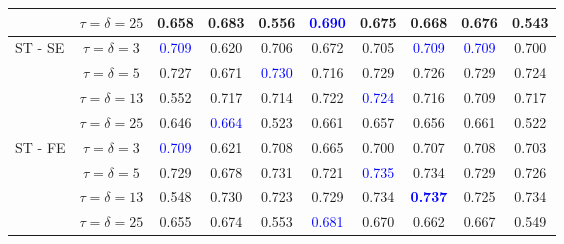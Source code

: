 \documentclass[nohyperref]{article}
\theoremstyle{plain}
\theoremstyle{definition}
\theoremstyle{remark}
\begin{document}
\begin{table*}[h!]
\begin{tabular}{p{2cm}|c|cccccccc}
  & $\tau=\delta=25$ & 0.658	&	0.683	&	0.556	&	\textcolor{blue}{0.690}	&	0.675	&	0.668	&	0.676	& 0.543\\	\hline
\multirow{4}{1.3cm}{ \hspace{15mm} ST - SE} &$\tau=\delta=3$ & \textcolor{blue}{0.709}	&	0.620	&	0.706	&	0.672	&	0.705	&	\textcolor{blue}{0.709}	&	\textcolor{blue}{0.709}	& 0.700\\
  & $\tau=\delta=5$ &  0.727	&	0.671	&	\textcolor{blue}{0.730}	&	0.716	&	0.729	&	0.726	&	0.729 & 0.724\\
  & $\tau=\delta=13$ & 0.552	&	0.717	&	0.714	&	0.722	&	\textcolor{blue}{0.724}	&	0.716	&	0.709& 0.717 \\
  & $\tau=\delta=25$ &  0.646	&	\textcolor{blue}{0.664}	&	0.523	&	0.661	&	0.657	&	0.656	&	0.661	&	0.522\\\hline \multirow{4}{1.1cm}{ \hspace{15mm} ST - FE}& $\tau=\delta=3$ & \textcolor{blue}{0.709}	&	0.621	&	0.708	&	0.665	&	0.700	&	0.707	&	0.708 & 0.703 \\
  & $\tau=\delta=5$ & 0.729	&	0.678	&	0.731	&	0.721	&	\textcolor{blue}{0.735}	&	0.734	&	0.729 &0.726\\
  & $\tau=\delta=13$ & 0.548	&	0.730	&	0.723	&	0.729	&	0.734	&	\textbf{\textcolor{blue}{0.737}}	&	0.725& 	0.734\\
  & $\tau=\delta=25$ & 0.655	&	0.674	&	0.553	&	\textcolor{blue}{0.681}	&	0.670	&	0.662	&	0.667	& 0.549\\ \hline
  \end{tabular}\end{table*}
\end{document}
